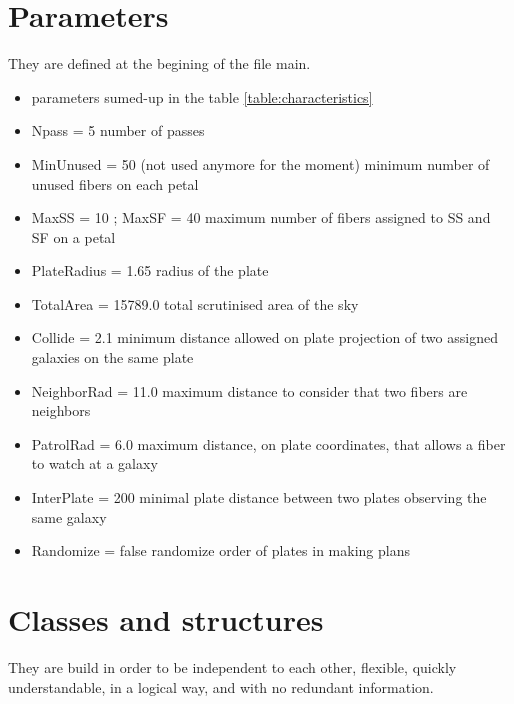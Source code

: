 \documentclass[10pt]{extarticle}
\begin{document}
\begin{multicols}{2}
\section{Parameters}
They are defined at the begining of the file main.
\begin{itemize} 
	\item parameters sumed-up in the table \ref{table:characteristics}
	\item Npass = 5 number of passes
	\item MinUnused = 50 (not used anymore for the moment) minimum number of unused fibers on each petal
	\item MaxSS = 10 ; MaxSF = 40 maximum number of fibers assigned to SS and SF on a petal
	\item PlateRadius = 1.65 radius of the plate
	\item TotalArea = 15789.0 total scrutinised area of the sky
	\item Collide = 2.1 minimum distance allowed on plate projection of two assigned galaxies on the same plate
	\item NeighborRad = 11.0 maximum distance to consider that two fibers are neighbors
	\item PatrolRad = 6.0 maximum distance, on plate coordinates, that allows a fiber to watch at a galaxy
	\item InterPlate = 200 minimal plate distance between two plates observing the same galaxy
	\item Randomize = false randomize order of plates in making plans
\end{itemize} 


\section{Classes and structures}
They are build in order to be independent to each other, flexible, quickly understandable, in a logical way, and with no redundant information.

\end{multicols}
\end{document}
